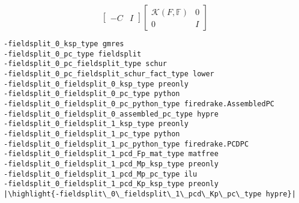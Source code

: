 \documentclass[presentation]{beamer}
\newcommand{\KSP}[2]{\ensuremath{\mathcal{K}\left(#1, \mathbb{#2}\right)}}
\newcommand{\ksp}[1]{\KSP{#1}{#1}}
\newcommand{\highlight}[1]{\colorbox{red!20}{\color{black} #1}}
\begin{document}
\begin{frame}[fragile]
\begin{onlyenv}
\begin{equation*}
{\begin{bmatrix}
        -C & I
      \end{bmatrix}
      \begin{bmatrix}
        \ksp{F} & 0 \\
        0 & I
      \end{bmatrix}}
    \end{equation*}
\begin{verbatim}
-fieldsplit_0_ksp_type gmres
-fieldsplit_0_pc_type fieldsplit
-fieldsplit_0_pc_fieldsplit_type schur
-fieldsplit_0_pc_fieldsplit_schur_fact_type lower
-fieldsplit_0_fieldsplit_0_ksp_type preonly
-fieldsplit_0_fieldsplit_0_pc_type python
-fieldsplit_0_fieldsplit_0_pc_python_type firedrake.AssembledPC
-fieldsplit_0_fieldsplit_0_assembled_pc_type hypre
-fieldsplit_0_fieldsplit_1_ksp_type preonly
-fieldsplit_0_fieldsplit_1_pc_type python
-fieldsplit_0_fieldsplit_1_pc_python_type firedrake.PCDPC
-fieldsplit_0_fieldsplit_1_pcd_Fp_mat_type matfree
-fieldsplit_0_fieldsplit_1_pcd_Mp_ksp_type preonly
-fieldsplit_0_fieldsplit_1_pcd_Mp_pc_type ilu
-fieldsplit_0_fieldsplit_1_pcd_Kp_ksp_type preonly
|\highlight{-fieldsplit\_0\_fieldsplit\_1\_pcd\_Kp\_pc\_type hypre}|
\end{verbatim}
  \end{onlyenv}
\end{frame}
\end{document}
